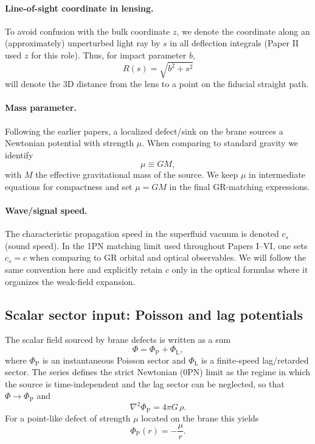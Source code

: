 \documentclass[11pt]{article}
\newcommand{\cS}{c_s}
\newcommand{\PhiP}{\Phi_{\mathrm{P}}}
\newcommand{\PhiL}{\Phi_{\mathrm{L}}}
\newcommand{\PhiTot}{\Phi}
\begin{document}
\paragraph{Line-of-sight coordinate in lensing.}
To avoid confusion with the bulk coordinate $z$, we denote the coordinate along an (approximately)
unperturbed light ray by $s$ in all deflection integrals (Paper II used $z$ for this role).
Thus, for impact parameter $b$,
\begin{equation}
  R(s) = \sqrt{b^2+s^2}
\end{equation}
will denote the 3D distance from the lens to a point on the fiducial straight path.

\paragraph{Mass parameter.}
Following the earlier papers, a localized defect/sink on the brane sources a Newtonian potential
with strength $\mu$.  When comparing to standard gravity we identify
\begin{equation}
  \mu \equiv GM,
\end{equation}
with $M$ the effective gravitational mass of the source.
We keep $\mu$ in intermediate equations for compactness and set $\mu=GM$ in the final GR-matching
expressions.

\paragraph{Wave/signal speed.}
The characteristic propagation speed in the superfluid vacuum is denoted $\cS$ (sound speed).
In the 1PN matching limit used throughout Papers I--VI, one sets $\cS=c$ when comparing to GR
orbital and optical observables.  We will follow the same convention here and explicitly retain
$c$ only in the optical formulas where it organizes the weak-field expansion.

\subsection{Scalar sector input: Poisson and lag potentials}
The scalar field sourced by brane defects is written as a sum
\begin{equation}
  \PhiTot = \PhiP + \PhiL,
\end{equation}
where $\PhiP$ is an instantaneous Poisson sector and $\PhiL$ is a finite-speed lag/retarded sector.
The series defines the strict Newtonian (0PN) limit as the regime in which the source is
time-independent and the lag sector can be neglected, so that $\PhiTot \to \PhiP$ and
\begin{equation}
  \nabla^2 \PhiP = 4\pi G\,\rho.
  \label{eq:inputs_poisson}
\end{equation}
For a point-like defect of strength $\mu$ located on the brane this yields
\begin{equation}
  \PhiP(r) = -\frac{\mu}{r}.
  \label{eq:inputs_point_potential}
\end{equation}
\end{document}
